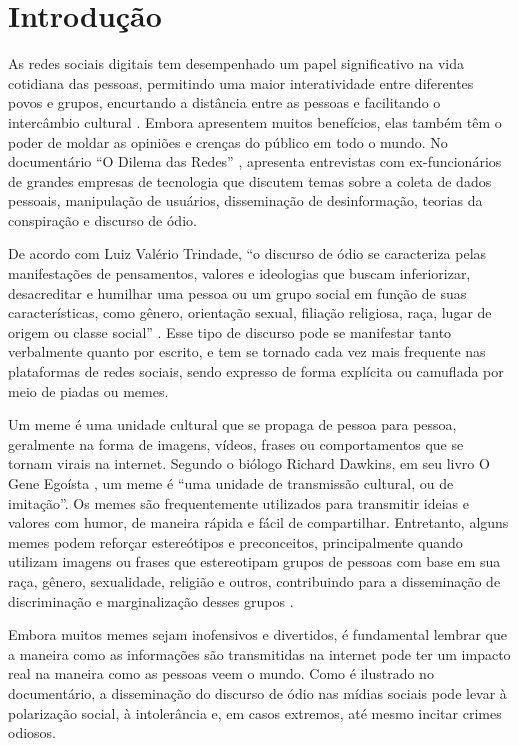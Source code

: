 \chapter{Introdução}
\label{cap:01}

As redes sociais digitais tem desempenhado um papel significativo na vida cotidiana das pessoas, permitindo uma maior interatividade entre diferentes povos e grupos, encurtando a distância entre as pessoas e facilitando o intercâmbio cultural \cite{Nascimento2017}. Embora apresentem muitos benefícios, elas também têm o poder de moldar as opiniões e crenças do público em todo o mundo. No documentário “O Dilema das Redes” \cite{SocialDilemma2020}, apresenta entrevistas com ex-funcionários de grandes empresas de tecnologia que discutem temas sobre a coleta de dados pessoais, manipulação de usuários, disseminação de desinformação, teorias da conspiração e discurso de ódio.

De acordo com Luiz Valério Trindade, ``o discurso de ódio se caracteriza pelas manifestações de pensamentos, valores e ideologias que buscam inferiorizar, desacreditar e humilhar uma pessoa ou um grupo social em função de suas características, como gênero, orientação sexual, filiação religiosa, raça, lugar de origem ou classe social'' \cite{Trindade2022}. Esse tipo de discurso pode se manifestar tanto verbalmente quanto por escrito, e tem se tornado cada vez mais frequente nas plataformas de redes sociais, sendo expresso de forma explícita ou camuflada por meio de piadas ou memes.

Um meme é uma unidade cultural que se propaga de pessoa para pessoa, geralmente na forma de imagens, vídeos, frases ou comportamentos que se tornam virais na internet. Segundo o biólogo Richard Dawkins, em seu livro O Gene Egoísta \cite{Dawkins1976}, um meme é ``uma unidade de transmissão cultural, ou de imitação''. Os memes são frequentemente utilizados para transmitir ideias e valores com humor, de maneira rápida e fácil de compartilhar. Entretanto, alguns memes podem reforçar estereótipos e preconceitos, principalmente quando utilizam imagens ou frases que estereotipam grupos de pessoas com base em sua raça, gênero, sexualidade, religião e outros, contribuindo para a disseminação de discriminação e marginalização desses grupos \cite{Burke2004}.

Embora muitos memes sejam inofensivos e divertidos, é fundamental lembrar que a maneira como as informações são transmitidas na internet pode ter um impacto real na maneira como as pessoas veem o mundo. Como é ilustrado no documentário, a disseminação do discurso de ódio nas mídias sociais pode levar à polarização social, à intolerância e, em casos extremos, até mesmo incitar crimes odiosos.

